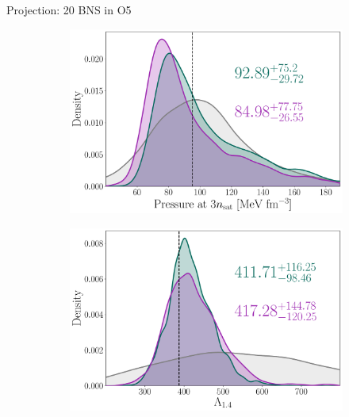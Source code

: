 \documentclass[usenames,dvipsnames,t]{beamer}
\begin{document}
\begin{frame}{Projection: 20 BNS in O5}
  \begin{figure}
    \centering
    \begin{subfigure}[t]{0.475\textwidth}
        \centering
        \includegraphics[width=\textwidth]{Figures/p3nsat.pdf}
    \end{subfigure}
    \hfill
    \begin{subfigure}[t]{0.475\textwidth}
        \centering
        \includegraphics[width=\textwidth]{Figures/l14.pdf}
    \end{subfigure}
  \end{figure}
\end{frame}
\end{document}
